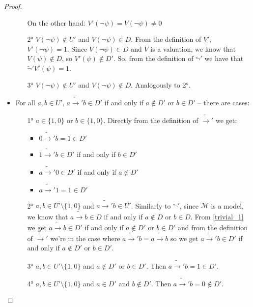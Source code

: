 \documentclass{article}
\theoremstyle{definition}
\theoremstyle{definition}
\theoremstyle{definition}
\theoremstyle{definition}
\theoremstyle{definition}
\newcommand*{\ra}{\rightarrow}
\begin{document}
\begin{proof}
\begin{itemize}
\begin{enumerate}
{\begin{enumerate}
                                On the other hand: $V'(\lnot \psi) = V(\lnot \psi) \not = 0$
                        \end{enumerate}
                        }
                  \item[2°] $V(\lnot \psi) \not \in U'$ and $V(\lnot \psi) \in D$. From the definition of $V'$, $V'(\lnot \psi) = 1$. Since $V(\lnot \psi) \in D$ and $V$ is a valuation, we know that $V(\psi) \not \in D$, so $V'(\psi) \not \in D'$. So, from the definition of $\tilde{\lnot}'$ we have that $\tilde{\lnot}'V'(\psi) = 1$.
                  \item[3°] $V(\lnot \psi) \not \in U'$ and $V(\lnot \psi) \not \in D$. Analogously to 2°.
              \end{enumerate}
        \item For all $a, b \in U'$, $a \tilde{\ra}'b \in D'$ if and only if $a \not \in D'$
              or $b \in D'$ -- there are cases:
              \begin{enumerate}
                  \item[1°] $a \in \{1, 0\}$ or $b \in \{1, 0\}$. Directly from the definition of $\tilde{\ra}'$ we get:
                      \begin{itemize}
                          \item $0 \tilde{\ra}' b = 1 \in D'$
                          \item $1 \tilde{\ra}' b \in D'$ if and only if $b \in D'$
                          \item $a \tilde{\ra}' 0 \in D'$ if and only if $a \not \in D'$
                          \item $a \tilde{\ra}' 1 = 1 \in D'$
                      \end{itemize}
                  \item[2°] $a, b \in U' \setminus \{1, 0\}$ and $a \tilde{\ra}' b \in U'$. Similarly to $\tilde{\lnot}'$, since $\mathcal{M}$ is a model, we know that $a \tilde{\ra} b \in D$ if and only if $a \not \in D$ or $b \in D$. From \cref{trivial_1} we get $a \tilde{\ra} b \in D'$ if and only if $a \not \in D'$ or $b \in D'$ and from the definition of $\tilde{\ra}'$ we're in the case where $a \tilde{\ra}'b = a \tilde{\ra} b$ so we get $a \tilde{\ra}' b \in D'$ if and only if $a \not \in D'$ or $b \in D'$.
                  \item[3°] $a, b \in U' \setminus \{1, 0\}$ and $a \not \in D'$ or $b \in D'$. Then $a \tilde{\ra}' b = 1 \in D'$.
                  \item[4°] $a, b \in U' \setminus \{1, 0\}$ and $a \in D'$ and $b \not \in D'$. Then $a \tilde{\ra}' b = 0 \not \in D'$.


\end{enumerate}
\end{itemize}
\end{proof}
\end{document}
